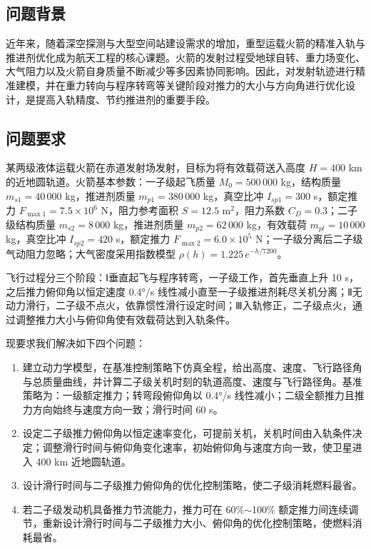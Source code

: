 \documentclass[withoutpreface,bwprint]{cumcmthesis}
\begin{document}
\subsection{问题背景}
近年来，随着深空探测与大型空间站建设需求的增加，重型运载火箭的精准入轨与推进剂优化成为航天工程的核心课题。火箭的发射过程受地球自转、重力场变化、大气阻力以及火箭自身质量不断减少等多因素协同影响。因此，对发射轨迹进行精准建模，并在重力转向与程序转弯等关键阶段对推力的大小与方向角进行优化设计，是提高入轨精度、节约推进剂的重要手段\cite{yu2023}。

\subsection{问题要求}
某两级液体运载火箭在赤道发射场发射，目标为将有效载荷送入高度 $H=400$ km 的近地圆轨道。火箭基本参数：一子级起飞质量 $M_0=500\,000$ kg，结构质量 $m_{s1}=40\,000$ kg，推进剂质量 $m_{p1}=380\,000$ kg，真空比冲 $I_{sp1}=300$ s，额定推力 $F_{\max1}=7.5\times10^6$ N，阻力参考面积 $S=12.5$ m$^2$，阻力系数 $C_D=0.3$；二子级结构质量 $m_{s2}=8\,000$ kg，推进剂质量 $m_{p2}=62\,000$ kg，有效载荷 $m_{pl}=10\,000$ kg，真空比冲 $I_{sp2}=420$ s，额定推力 $F_{\max2}=6.0\times10^5$ N；一子级分离后二子级气动阻力忽略；大气密度采用指数模型 $\rho(h)=1.225\,e^{-h/7200}$。

飞行过程分三个阶段：Ⅰ垂直起飞与程序转弯，一子级工作，首先垂直上升 10 s，之后推力俯仰角以恒定速度 0.4°/s 线性减小直至一子级推进剂耗尽关机分离；Ⅱ无动力滑行，二子级不点火，依靠惯性滑行设定时间；Ⅲ入轨修正，二子级点火，通过调整推力大小与俯仰角使有效载荷达到入轨条件。

现要求我们解决如下四个问题：
\begin{enumerate}
    \item 建立动力学模型，在基准控制策略下仿真全程，给出高度、速度、飞行路径角与总质量曲线，并计算二子级关机时刻的轨道高度、速度与飞行路径角。基准策略为：一级额定推力；转弯段俯仰角以 0.4°/s 线性减小；二级全额推力且推力方向始终与速度方向一致；滑行时间 60 s。
    \item 设定二子级推力俯仰角以恒定速率变化，可提前关机，关机时间由入轨条件决定；调整滑行时间与俯仰角变化速率，初始俯仰角与速度方向一致，使卫星进入 400 km 近地圆轨道。
    \item 设计滑行时间与二子级推力俯仰角的优化控制策略，使二子级消耗燃料最省。
    \item 若二子级发动机具备推力节流能力，推力可在 60\%$\sim$100\% 额定推力间连续调节，重新设计滑行时间与二子级推力大小、俯仰角的优化控制策略，使燃料消耗最省。
\end{enumerate}
\end{document}
